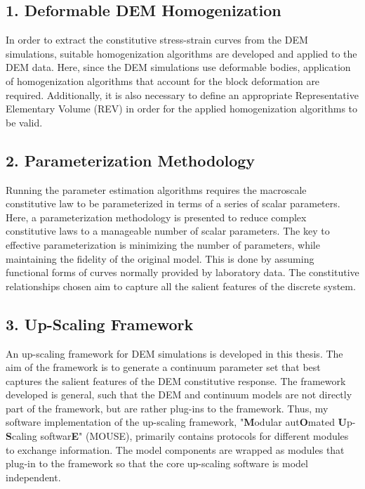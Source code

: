 \subsection*{1. Deformable DEM Homogenization}

In order to extract the constitutive stress-strain curves from the DEM simulations, suitable homogenization algorithms are developed and applied to the DEM data. Here, since the DEM simulations use deformable bodies, application of homogenization algorithms that account for the block deformation are required.  Additionally, it is also necessary to define an appropriate Representative Elementary Volume (REV) in order for the applied homogenization algorithms to be valid.

\subsection*{2. Parameterization Methodology}

Running the parameter estimation algorithms requires the macroscale constitutive law to be parameterized in terms of a series of scalar parameters. Here, a parameterization methodology is presented to reduce complex constitutive laws to a manageable number of scalar parameters. The key to effective parameterization is minimizing the number of parameters, while maintaining the fidelity of the original model. This is done by assuming functional forms of curves normally provided by laboratory data. The constitutive relationships chosen aim to capture all the salient features of the discrete system. 

\subsection*{3. Up-Scaling Framework}

An up-scaling framework for DEM simulations is developed in this thesis. The aim of the framework is to generate a continuum parameter set that best captures the salient features of the DEM constitutive response. The framework developed is general, such that the DEM and continuum models are not directly part of the framework, but are rather plug-ins to the framework. Thus, my software implementation of the up-scaling framework, "\textbf{M}odular aut\textbf{O}mated \textbf{U}p-\textbf{S}caling softwar\textbf{E}" (MOUSE), primarily contains protocols for different modules to exchange information. The model components are wrapped as modules that plug-in to the framework so that the core up-scaling software is model independent. 


